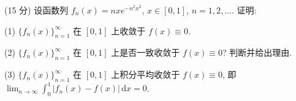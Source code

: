 (15 分) 设函数列 $f_{n}(x) = nxe^{-n^{2}x^{2}}$, $x \in [0,1]$, $n = 1,2,\dots$. 证明:\par
(1) $\{f_n(x)\}_{n=1}^{\infty}$ 在 $[0,1]$ 上收敛于 $f(x) \equiv 0$.\par
(2) $\{f_n(x)\}_{n=1}^{\infty}$ 在 $[0,1]$ 上是否一致收敛于 $f(x) \equiv 0$? 判断并给出理由.\par
(3) $\{f_n(x)\}_{n=1}^{\infty}$ 在 $[0,1]$ 上积分平均收敛于 $f(x) \equiv 0$, 即 $\lim_{n \to \infty} \int_0^1 |f_n(x) - f(x)| \, \mathrm{d}x = 0$.\par
